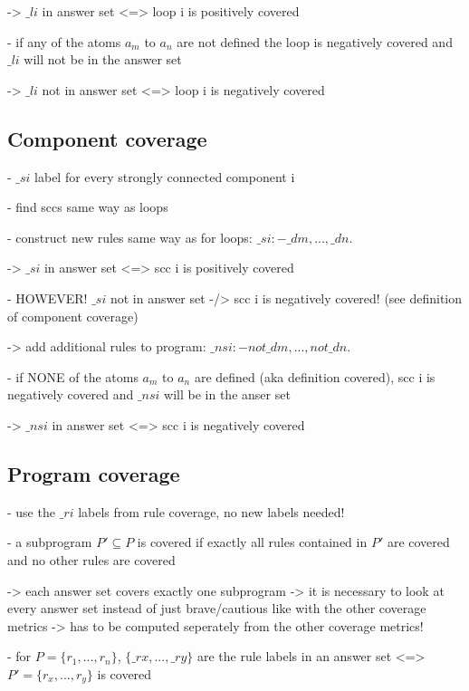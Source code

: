 -> $\_li$ in answer set <=> loop i is positively covered

- if any of the atoms $a_m$ to $a_n$ are not defined the loop is negatively covered and  $\_li$ will not be in the answer set

-> $\_li$ not in answer set <=> loop i is negatively covered

\subsection{Component coverage}
\label{subsec:Computing coverage metrics for propositional programs/General approach/Component coverage}
- $\_si$ label for every strongly connected component i

- find sccs same way as loops

- construct new rules same way as for loops: $\_si :- \_dm, ... , \_dn$.

-> $\_si$ in answer set <=> scc i is positively covered

- HOWEVER! $\_si$ not in answer set -/> scc i is negatively covered! (see definition of component coverage)

-> add additional rules to program: $\_nsi :- not \_dm, ..., not \_dn$.

- if NONE of the atoms $a_m$ to $a_n$ are defined (aka definition covered), scc i is negatively covered and $\_nsi$ will be in the anser set

-> $\_nsi$ in answer set <=> scc i is negatively covered

\subsection{Program coverage}
\label{subsec:Computing coverage metrics for propositional programs/General approach/Program coverage}
- use the $\_ri$ labels from rule coverage, no new labels needed!

- a subprogram $P' \subseteq P$ is covered if exactly all rules contained in $P'$ are covered and no other rules are covered

-> each answer set covers exactly one subprogram -> it is necessary to look at every answer set instead of just brave/cautious like 
with the other coverage metrics -> has to be computed seperately from the other coverage metrics!

- for $P = \{r_1,...,r_n\}$,  $\{\_rx,...,\_ry\}$ are the rule labels in an answer set <=> $P'=\{r_x,...,r_y\}$ is covered


